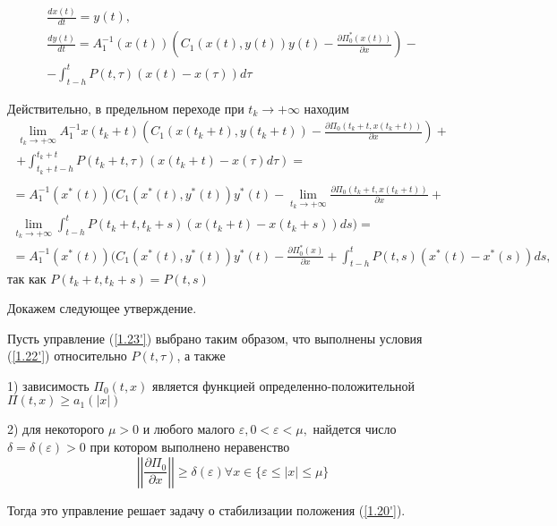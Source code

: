 \begin{equation} \label{1.25'}
	\begin{array}{c}
		\frac{d x(t)}{d t} = y(t),\\
		\frac{d y(t)}{d t} = A_1^{-1} (x(t)) (C_1 (x(t), y(t)) y(t) - \frac{\partial \Pi_0^{*} (x(t))}{\partial x}) -\\- \displaystyle \int_{t- h}^{t} P(t, \tau) (x(t) - x(\tau)) d \tau
	\end{array}
\end{equation}

Действительно, в предельном переходе при $t_k \to + \infty$ находим 
$$
\begin{array}{c}
\displaystyle \lim_{t_k \to + \infty} A_1^{-1} x(t_k + t) (C_1 (x(t_k + t), y(t_k + t)) - \frac{\partial \Pi_0 (t_k + t, x(t_k + t))}{\partial x})+\\
\displaystyle + \int_{t_k+t-h}^{t_k+t} P(t_k + t, \tau) (x(t_k + t) - x(\tau) d \tau)=\\
\end{array}
$$
$$
\begin{array}{c}
\displaystyle = A_1^{-1} (x^{*} (t)) (C_1 (x^{*}(t), y^{*}(t)) y^{*}(t) - \lim_{t_k \to + \infty} \frac{\partial \Pi_0 (t_k +t, x (t_k + t))}{\partial x} +\\
\displaystyle \lim_{t_k \to + \infty} \int_{t - h}^{t} P(t_k + t, t_k + s) ( x(t_k + t) - x(t_k + s)) ds) =\\
\displaystyle =A_1^{-1} ( x^{*} (t)) (C_1 (x^{*} (t), y^{*}(t)) y^{*} (t) - \frac{\partial \Pi_0^{*} (x)}{\partial x} + \int_{t - h}^{t} P (t, s) (x^{*} (t) - x^{*} (s)) ds,
\end{array}
$$
так как $P(t_k + t, t_k + s) = P(t, s)$

Докажем следующее утверждение. 

\begin{theorem} \label{1.6'}
Пусть управление (\ref{1.23'}) выбрано таким образом, что выполнены условия (\ref{1.22'}) относительно $P(t, \tau)$, а также 

1) зависимость $\Pi_0 (t, x)$ является функцией определенно-положительной $\Pi (t, x) \ge a_1 (\left| x \right|)$

 2) для некоторого $\mu > 0$ и любого малого $\varepsilon, 0 < \varepsilon < \mu, $ найдется число $\delta = \delta (\varepsilon) > 0$ при котором выполнено неравенство $$\left| \left| \frac{\partial \Pi_0}{\partial x} \right| \right| \ge \delta (\varepsilon) \forall x \in \lbrace \varepsilon \le \left| x \right| \le \mu \rbrace$$

Тогда это управление решает задачу о стабилизации положения (\ref{1.20'}).
\end{theorem}

